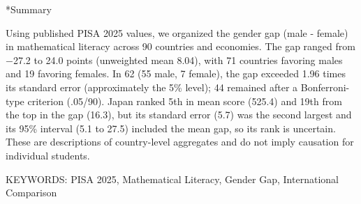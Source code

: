 \documentclass[a4paper,10pt,twocolumn]{ltjsarticle}
\makeatletter
\renewcommand{\section}{\@startsection{section}{1}{\z@}{1.1\Cvs \@plus.4\Cdp \@minus.2\Cdp}{.5\Cvs \@plus.2\Cdp}{\normalfont\gtfamily\bfseries\large}}
\makeatother
\begin{document}
\section*{Summary}
{\footnotesize\setlength{\parindent}{0pt}Using published PISA 2025 values, we organized the gender gap (male - female) in mathematical literacy across 90 countries and economies. The gap ranged from −27.2 to 24.0 points (unweighted mean 8.04), with 71 countries favoring males and 19 favoring females. In 62 (55 male, 7 female), the gap exceeded 1.96 times its standard error (approximately the 5\% level); 44 remained after a Bonferroni-type criterion (.05/90). Japan ranked 5th in mean score (525.4) and 19th from the top in the gap (16.3), but its standard error (5.7) was the second largest and its 95\% interval (5.1 to 27.5) included the mean gap, so its rank is uncertain. These are descriptions of country-level aggregates and do not imply causation for individual students.\par\smallskip KEYWORDS: PISA 2025, Mathematical Literacy, Gender Gap, International Comparison\par}
\medskip\noindent{}
\end{document}

